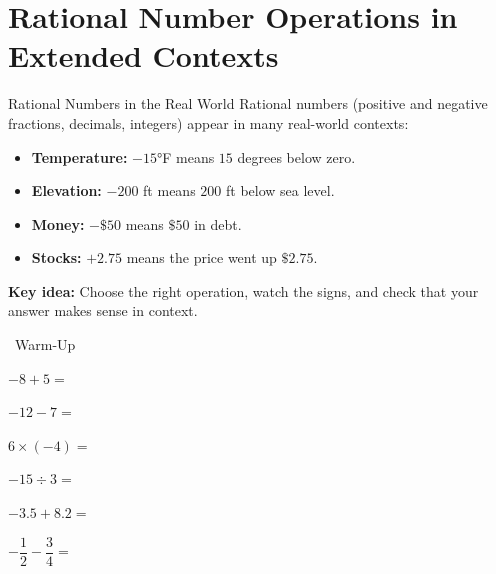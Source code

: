 \section{Rational Number Operations in Extended Contexts}

\begin{quickReview}{Rational Numbers in the Real World}
Rational numbers (positive and negative fractions, decimals, integers) appear in many real-world contexts:

\begin{itemize}[leftmargin=*]
    \item \textbf{Temperature:} $-15°$F means $15$ degrees below zero.
    \item \textbf{Elevation:} $-200$ ft means $200$ ft below sea level.
    \item \textbf{Money:} $-\$50$ means $\$50$ in debt.
    \item \textbf{Stocks:} $+2.75$ means the price went up $\$2.75$.
\end{itemize}

\medskip
\textbf{Key idea:} Choose the right operation, watch the signs, and check that your answer makes sense in context.
\end{quickReview}

\begin{practiceBox}[funGreen]{\faSun~Warm-Up}


\begin{multicols}{2}
\prob $-8 + 5 =$ \answerBlank[2cm]

\prob $-12 - 7 =$ \answerBlank[2cm]

\prob $6 \times (-4) =$ \answerBlank[2cm]

\prob $-15 \div 3 =$ \answerBlank[2cm]

\prob $-3.5 + 8.2 =$ \answerBlank[2cm]

\prob $-\dfrac{1}{2} - \dfrac{3}{4} =$ \answerBlank[2cm]
\end{multicols}
\end{practiceBox}


